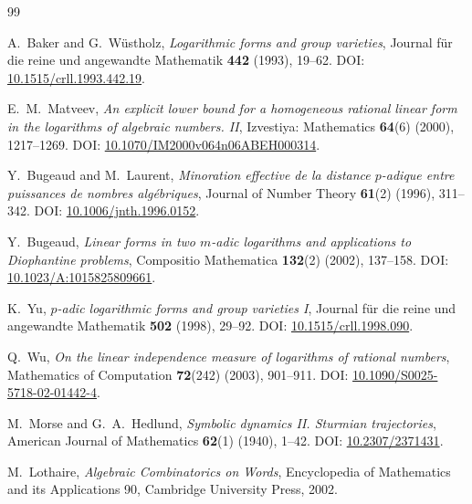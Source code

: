 \documentclass[11pt,oneside]{article}
\theoremstyle{definition}
\theoremstyle{remark}
\begin{document}
\begin{thebibliography}{99}

A.~Baker and G.~W\"ustholz,
\newblock \emph{Logarithmic forms and group varieties},
\newblock Journal f\"ur die reine und angewandte Mathematik \textbf{442} (1993), 19--62.
\newblock DOI: \href{https://doi.org/10.1515/crll.1993.442.19}{10.1515/crll.1993.442.19}.

E.~M.~Matveev,
\newblock \emph{An explicit lower bound for a homogeneous rational linear form in the logarithms of algebraic numbers. II},
\newblock Izvestiya: Mathematics \textbf{64}(6) (2000), 1217--1269.
\newblock DOI: \href{https://doi.org/10.1070/IM2000v064n06ABEH000314}{10.1070/IM2000v064n06ABEH000314}.

Y.~Bugeaud and M.~Laurent,
\newblock \emph{Minoration effective de la distance $p$-adique entre puissances de nombres alg\'ebriques},
\newblock Journal of Number Theory \textbf{61}(2) (1996), 311--342.
\newblock DOI: \href{https://doi.org/10.1006/jnth.1996.0152}{10.1006/jnth.1996.0152}.

Y.~Bugeaud,
\newblock \emph{Linear forms in two $m$-adic logarithms and applications to Diophantine problems},
\newblock Compositio Mathematica \textbf{132}(2) (2002), 137--158.
\newblock DOI: \href{https://doi.org/10.1023/A:1015825809661}{10.1023/A:1015825809661}.

K.~Yu,
\newblock \emph{$p$-adic logarithmic forms and group varieties I},
\newblock Journal f\"ur die reine und angewandte Mathematik \textbf{502} (1998), 29--92.
\newblock DOI: \href{https://doi.org/10.1515/crll.1998.090}{10.1515/crll.1998.090}.

Q.~Wu,
\newblock \emph{On the linear independence measure of logarithms of rational numbers},
\newblock Mathematics of Computation \textbf{72}(242) (2003), 901--911.
\newblock DOI: \href{https://doi.org/10.1090/S0025-5718-02-01442-4}{10.1090/S0025-5718-02-01442-4}.

M.~Morse and G.~A.~Hedlund,
\newblock \emph{Symbolic dynamics II. Sturmian trajectories},
\newblock American Journal of Mathematics \textbf{62}(1) (1940), 1--42.
\newblock DOI: \href{https://doi.org/10.2307/2371431}{10.2307/2371431}.

M.~Lothaire,
\newblock \emph{Algebraic Combinatorics on Words},
\newblock Encyclopedia of Mathematics and its Applications 90, Cambridge University Press, 2002.


\end{thebibliography}
\end{document}
